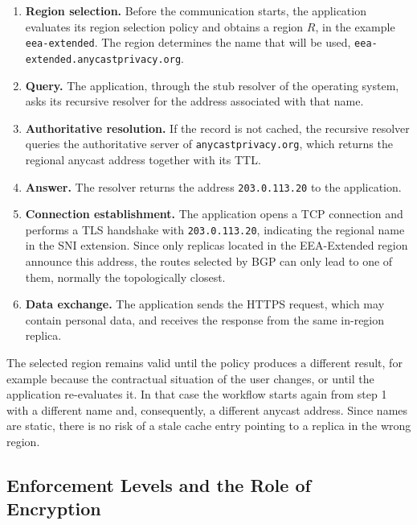 \documentclass[
A4paper,                %
twoside,                %
openright,              %
chapterprefix=true,     %
12pt,                   %
headings=normal,        %
titlepage=on            %
]{book}
\begin{document}
\begin{enumerate}
    \item \textbf{Region selection.} Before the communication starts, the application evaluates its region selection policy and obtains a region $R$, in the example \texttt{eea-extended}. The region determines the name that will be used, \texttt{eea-extended.anycastprivacy.org}.

    \item \textbf{Query.} The application, through the stub resolver of the operating system, asks its recursive resolver for the address associated with that name.

    \item[3--4.] \textbf{Authoritative resolution.} If the record is not cached, the recursive resolver queries the authoritative server of \texttt{anycastprivacy.org}, which returns the regional anycast address together with its TTL.

    \setcounter{enumi}{4}
    \item \textbf{Answer.} The resolver returns the address \texttt{203.0.113.20} to the application.

    \item \textbf{Connection establishment.} The application opens a TCP connection and performs a TLS handshake with \texttt{203.0.113.20}, indicating the regional name in the SNI extension. Since only replicas located in the EEA-Extended region announce this address, the routes selected by BGP can only lead to one of them, normally the topologically closest.

    \item[7--8.] \textbf{Data exchange.} The application sends the HTTPS request, which may contain personal data, and receives the response from the same in-region replica.
\end{enumerate}

The selected region remains valid until the policy produces a different result, for example because the contractual situation of the user changes, or until the application re-evaluates it. In that case the workflow starts again from step 1 with a different name and, consequently, a different anycast address. Since names are static, there is no risk of a stale cache entry pointing to a replica in the wrong region.

\subsection{Enforcement Levels and the Role of Encryption}
\label{sc:rcadns_enforcement}
\end{document}
